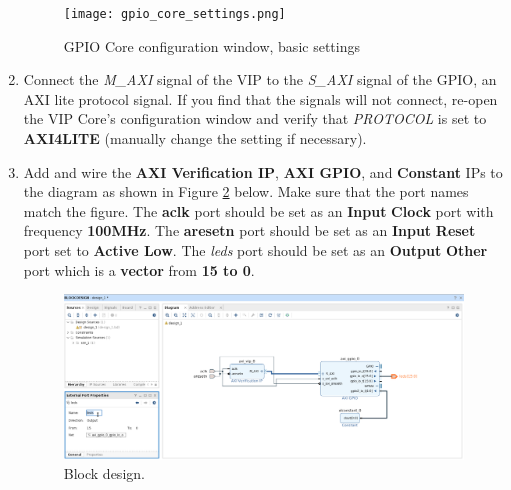 \documentclass[11pt]{article}
\begin{document}
\begin{enumerate}
    \begin{figure}[H]
      \centering
      \texttt{[image: gpio\_core\_settings.png]}
      \caption{GPIO Core configuration window, basic settings}
      \label{fig:gpiocoresettings}
    \end{figure}
    
    \item Connect the \textit{M\_AXI} signal of the VIP to the \textit{S\_AXI} signal of the GPIO, an AXI lite protocol signal. If you find that the signals will not connect, re-open the VIP Core's configuration window and verify that \textit{PROTOCOL} is set to \textbf{AXI4LITE} (manually change the setting if necessary).
    
    \item Add and wire the \textbf{AXI Verification IP}, \textbf{AXI GPIO}, and \textbf{Constant} IPs to the diagram as shown in Figure \ref{fig:bd} below. Make sure that the port names match the figure. The \textbf{aclk} port should be set as an \textbf{Input} \textbf{Clock} port with frequency \textbf{100MHz}. The \textbf{aresetn} port should be set as an \textbf{Input} \textbf{Reset} port set to \textbf{Active Low}. The \textit{leds} port should be set as an \textbf{Output} \textbf{Other} port which is a \textbf{vector} from \textbf{15 to 0}.
    
    \begin{figure}[H]
      \centering
      \includegraphics[width=\textwidth]{bd.png}
      \caption{Block design.}
      \label{fig:bd}
    \end{figure}

    
    

\end{enumerate}
\end{document}
